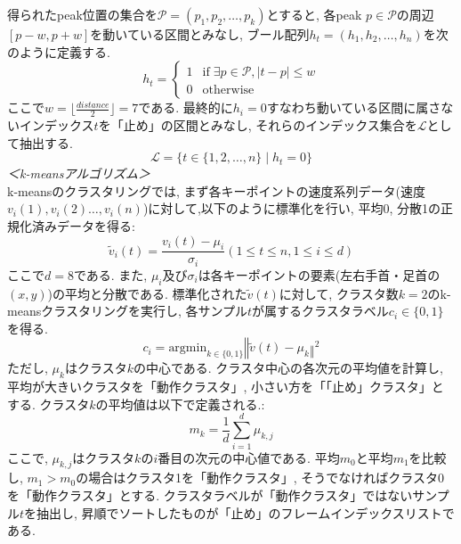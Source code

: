 \documentclass[paper]{ieicej}
\begin{document}
得られたpeak位置の集合を$\mathcal{P}=(p_{1},p_{2},\dots,p_{k})$とすると, 各peak $p\in \mathcal{P}$の周辺$[p-w,p+w]$を動いている区間とみなし, ブール配列$h_{t}=(h_{1},h_{2},\dots,h_{n})$を次のように定義する.
\begin{equation}
  h_{t}=
  \begin{cases}
    1 & \text{if}\; \exists p \in \mathcal{P}, |t-p| \leq w\\
    0 & \text{otherwise}
  \end{cases}
\end{equation}
ここで$w=\lfloor \frac{distance}{2} \rfloor=7$である. 最終的に$h_{i}=0$すなわち動いている区間に属さないインデックス$t$を「止め」の区間とみなし, それらのインデックス集合を$\mathcal{L}$として抽出する. 
\begin{equation}
  \mathcal{L} = \{ t \in \{1,2,\dots,n\} \mid h_t = 0 \}
\end{equation}
\textit{＜k-meansアルゴリズム＞}\\
k-meansのクラスタリングでは, まず各キーポイントの速度系列データ(速度$v_{i}(1),v_{i}(2)\dots,v_{i}(n)$)に対して,以下のように標準化を行い, 平均0, 分散1の正規化済みデータを得る:
\begin{equation}
  \tilde{v}_{i}(t)=\frac{v_{i}(t)-\mu_{i}}{\sigma_{i}}(1 \leq t \leq n,1 \leq i \leq d)
\end{equation}
ここで$d=8$である. また, $\mu_{i}$及び$\sigma_{i}$は各キーポイントの要素(左右手首・足首の$(x,y)$)の平均と分散である. 標準化された$\tilde{v}(t)$に対して, クラスタ数$k=2$のk-meansクラスタリングを実行し, 各サンプル$t$が属するクラスタラベル$c_{i} \in \{0,1\}$を得る. 
\begin{equation}
  c_{i}=\text{argmin}_{k \in \{0,1\}} ‖\tilde{v}(t)-\mu_{k} ‖^2
\end{equation}
ただし, $\mu_{k}$はクラスタ$k$の中心である. クラスタ中心の各次元の平均値を計算し, 平均が大きいクラスタを「動作クラスタ」, 小さい方を「「止め」クラスタ」とする. クラスタ$k$の平均値は以下で定義される.:
\begin{equation}
  m_{k}=\frac{1}{d}\sum_{i=1}^d \mu_{k,j}
\end{equation}
ここで, $\mu_{k,j}$はクラスタ$k$の$i$番目の次元の中心値である. 平均$m_{0}$と平均$m_{1}$を比較し, $m_{1}>m_{0}$の場合はクラスタ1を「動作クラスタ」, そうでなければクラスタ0を「動作クラスタ」とする. クラスタラベルが「動作クラスタ」ではないサンプル$t$を抽出し, 昇順でソートしたものが「止め」のフレームインデックスリストである.
\end{document}
